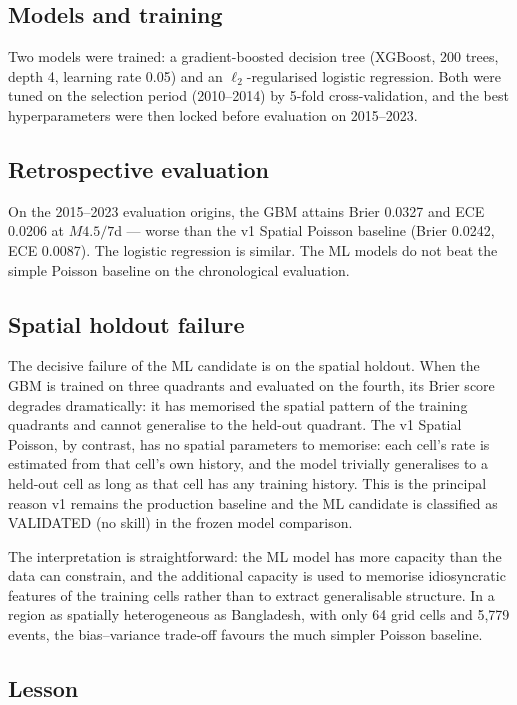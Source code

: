\documentclass[10pt,a4paper,twocolumn]{article}
\begin{document}
\subsection{Models and training}

Two models were trained: a gradient-boosted decision tree (XGBoost, 200 trees, depth 4, learning rate 0.05) and an $\ell_2$-regularised logistic regression. Both were tuned on the selection period (2010--2014) by 5-fold cross-validation, and the best hyperparameters were then locked before evaluation on 2015--2023.

\subsection{Retrospective evaluation}

On the 2015--2023 evaluation origins, the GBM attains Brier 0.0327 and ECE 0.0206 at $M4.5/7$d --- worse than the v1 Spatial Poisson baseline (Brier 0.0242, ECE 0.0087). The logistic regression is similar. The ML models do not beat the simple Poisson baseline on the chronological evaluation.

\subsection{Spatial holdout failure}

The decisive failure of the ML candidate is on the spatial holdout. When the GBM is trained on three quadrants and evaluated on the fourth, its Brier score degrades dramatically: it has memorised the spatial pattern of the training quadrants and cannot generalise to the held-out quadrant. The v1 Spatial Poisson, by contrast, has no spatial parameters to memorise: each cell's rate is estimated from that cell's own history, and the model trivially generalises to a held-out cell as long as that cell has any training history. This is the principal reason v1 remains the production baseline and the ML candidate is classified as VALIDATED (no skill) in the frozen model comparison.

The interpretation is straightforward: the ML model has more capacity than the data can constrain, and the additional capacity is used to memorise idiosyncratic features of the training cells rather than to extract generalisable structure. In a region as spatially heterogeneous as Bangladesh, with only 64 grid cells and 5{,}779 events, the bias--variance trade-off favours the much simpler Poisson baseline.

\subsection{Lesson}
\end{document}
